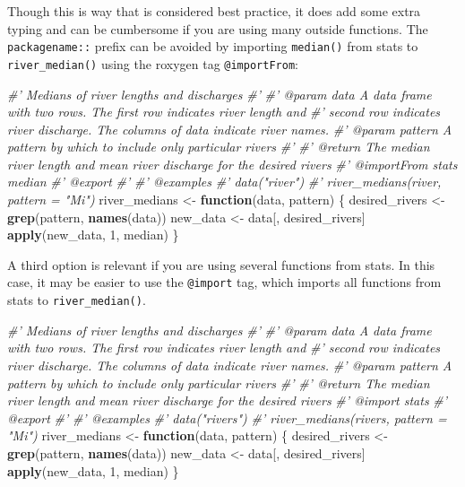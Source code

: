 \documentclass[
]{book}
\newenvironment{Shaded}{\begin{snugshade}}{\end{snugshade}}
\newcommand{\CommentTok}[1]{\textcolor[rgb]{0.56,0.35,0.01}{\textit{#1}}}
\newcommand{\ControlFlowTok}[1]{\textcolor[rgb]{0.13,0.29,0.53}{\textbf{#1}}}
\newcommand{\DecValTok}[1]{\textcolor[rgb]{0.00,0.00,0.81}{#1}}
\newcommand{\KeywordTok}[1]{\textcolor[rgb]{0.13,0.29,0.53}{\textbf{#1}}}
\newcommand{\NormalTok}[1]{#1}
\newcommand{\StringTok}[1]{\textcolor[rgb]{0.31,0.60,0.02}{#1}}
\begin{document}
Though this is way that is considered best practice, it does add some extra typing and can be cumbersome if you are using many outside functions. The \texttt{packagename::} prefix can be avoided by importing \texttt{median()} from stats to \texttt{river\_median()} using the roxygen tag \texttt{@importFrom}:

\begin{Shaded}
\begin{Highlighting}[]
\CommentTok{#' Medians of river lengths and discharges}
\CommentTok{#'}
\CommentTok{#' @param data A data frame with two rows. The first row indicates river length and}
\CommentTok{#'   second row indicates river discharge. The columns of data indicate river names.}
\CommentTok{#' @param pattern A pattern by which to include only particular rivers}
\CommentTok{#'}
\CommentTok{#' @return The median river length and mean river discharge for the desired rivers}
\CommentTok{#' @importFrom stats median}
\CommentTok{#' @export}
\CommentTok{#'}
\CommentTok{#' @examples}
\CommentTok{#' data("river")}
\CommentTok{#' river_medians(river, pattern = "Mi")}
\NormalTok{river_medians <-}\StringTok{ }\ControlFlowTok{function}\NormalTok{(data, pattern) \{}
\NormalTok{  desired_rivers <-}\StringTok{ }\KeywordTok{grep}\NormalTok{(pattern, }\KeywordTok{names}\NormalTok{(data))}
\NormalTok{  new_data <-}\StringTok{ }\NormalTok{data[, desired_rivers]}
  \KeywordTok{apply}\NormalTok{(new_data, }\DecValTok{1}\NormalTok{, median)}
\NormalTok{\}}
\end{Highlighting}
\end{Shaded}

A third option is relevant if you are using several functions from stats. In this case, it may be easier to use the \texttt{@import} tag, which imports all functions from stats to \texttt{river\_median()}.

\begin{Shaded}
\begin{Highlighting}[]
\CommentTok{#' Medians of river lengths and discharges}
\CommentTok{#'}
\CommentTok{#' @param data A data frame with two rows. The first row indicates river length and}
\CommentTok{#'   second row indicates river discharge. The columns of data indicate river names.}
\CommentTok{#' @param pattern A pattern by which to include only particular rivers}
\CommentTok{#'}
\CommentTok{#' @return The median river length and mean river discharge for the desired rivers}
\CommentTok{#' @import stats}
\CommentTok{#' @export}
\CommentTok{#'}
\CommentTok{#' @examples}
\CommentTok{#' data("rivers")}
\CommentTok{#' river_medians(rivers, pattern = "Mi")}
\NormalTok{river_medians <-}\StringTok{ }\ControlFlowTok{function}\NormalTok{(data, pattern) \{}
\NormalTok{  desired_rivers <-}\StringTok{ }\KeywordTok{grep}\NormalTok{(pattern, }\KeywordTok{names}\NormalTok{(data))}
\NormalTok{  new_data <-}\StringTok{ }\NormalTok{data[, desired_rivers]}
  \KeywordTok{apply}\NormalTok{(new_data, }\DecValTok{1}\NormalTok{, median)}
\NormalTok{\}}
\end{Highlighting}
\end{Shaded}
\end{document}
